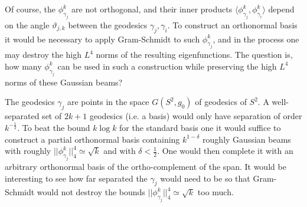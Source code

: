 \documentclass[10pt]{amsart}
\begin{document}
Of course, the $\phi^k_{\gamma_j}$ are not orthogonal, and their
inner products $\langle \phi^k_{\gamma_j}, \phi^k_{\gamma_i}
\rangle$ depend on the angle $\vartheta_{j, k}$ between the
geodesics $\gamma_j, \gamma_i$. To construct an orthonormal basis
it would be necessary to apply Gram-Schmidt to such
$\phi_{\gamma_j}^k$, and in the process one may destroy the high
$L^4$ norms of the resulting eigenfunctions. The question is, how
many $\phi^k_{\gamma_j}$ can be used in such a construction while
preserving the high $L^4$ norms of these Gaussian beams?

The geodesics $\gamma_j$ are points in the space $G(S^2, g_0)$ of
geodesics of $S^2$. A well-separated set of $2k + 1$ geodesics
(i.e. a basis) would only have separation of order
$k^{-\frac{1}{2}}$. To beat the bound $k \log k $ for the standard
basis one it would suffice to construct a partial  orthonormal
basis containing $k^{1- \delta} $ roughly Gaussian beams  with
roughly $||\phi^k_{\gamma_j}||_4^4 \simeq \sqrt{k}$ and with
$\delta < \frac{1}{2}$. One would then complete it with an
arbitrary orthonormal basis of the ortho-complement of the span.
It would be interesting to see how far separated the $\gamma_j$
would need to be so that Gram-Schmidt would not destroy the bounds
$||\phi^k_{\gamma_j}||_4^4 \simeq \sqrt{k}$ too much.
\end{document}
